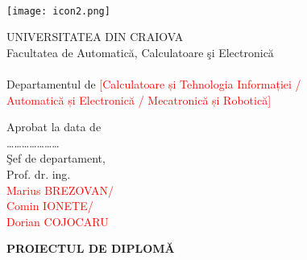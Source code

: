\newpage
\begin{singlespace}
    \begin{minipage}[t]{0.1\textwidth}
        \phantom{.}
        \\[-0.8\baselineskip]
        \texttt{[image: icon2.png]}
    \end{minipage}%
    \hfill
    \begin{minipage}[t]{0.6\textwidth}\raggedright
        UNIVERSITATEA DIN CRAIOVA\\
        Facultatea de Automatică, Calculatoare şi Electronică\\~\\
        Departamentul de \textcolor{red}{[Calculatoare și Tehnologia Informației / \\
        Automatică și Electronică / Mecatronică și Robotică]}
    \end{minipage}%
    \hfill
    \begin{minipage}[t]{0.2\textwidth}\begin{center}
        \fontsize{10}{11}\selectfont
        \phantom{.}
        Aprobat la data de\\
        …………………\\
        Şef de departament,\\
        Prof. dr. ing.\\ \textcolor{red}{Marius BREZOVAN/\\Comin IONETE/\\Dorian COJOCARU}
\end{center}\end{minipage}\end{singlespace}

\begin{center}
    \textbf{PROIECTUL DE DIPLOMĂ}
\end{center}

